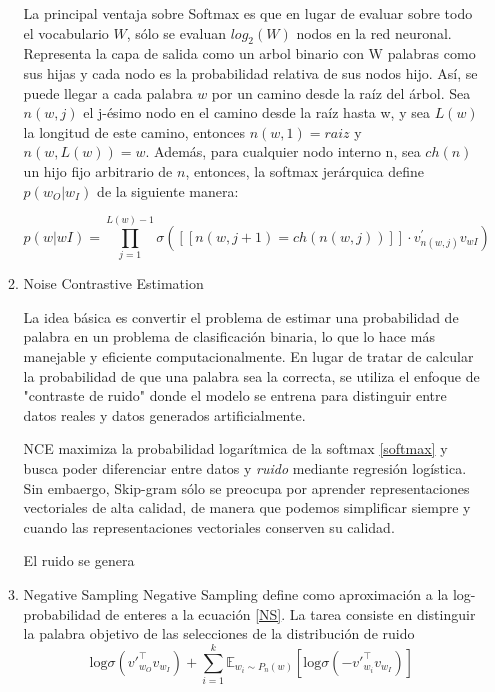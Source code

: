 \documentclass[letter, 11pt, twoside]{report}
\begin{document}
\begin{itemize}
\begin{enumerate}
      La principal ventaja sobre Softmax es que en lugar de evaluar sobre todo el vocabulario $W$, sólo se evaluan $log_2(W)$ nodos en la red neuronal. Representa la capa de salida como un arbol binario con W palabras como sus hijas y cada nodo es la probabilidad relativa de sus nodos hijo.
      Así, se puede llegar a cada palabra $w$ por un camino desde la raíz del árbol. Sea $n(w, j)$ el j-ésimo nodo en el camino desde la raíz hasta w, y sea $L(w)$ la longitud de este camino, entonces $n(w, 1) = raiz$ y $n(w, L(w)) = w$. Además, para cualquier nodo interno n, sea $ch(n)$ un hijo fijo arbitrario de $n$, entonces, la softmax jerárquica define $p(w_O|w_I )$ de la siguiente manera:

      \begin{equation}
        p(w|wI ) = \prod_{j=1}^{L(w)-1} \sigma \left( \left[ \left[ n(w, j + 1) = ch(n(w, j)) \right] \right] \cdot v_{n(w,j)}^\prime v_{wI} \right)
      \end{equation}

      
      
      \item Noise Contrastive Estimation 
      

      La idea básica es convertir el problema de estimar una probabilidad de palabra en un problema de clasificación binaria, lo que lo hace más manejable y eficiente computacionalmente. En lugar de tratar de calcular la probabilidad de que una palabra sea la correcta, se utiliza el enfoque de "contraste de ruido" donde el modelo se entrena para distinguir entre datos reales y datos generados artificialmente.
  
      NCE maximiza la probabilidad logarítmica de la softmax \ref{softmax} y busca poder diferenciar entre datos y \textit{ruido} mediante regresión logística. Sin embaergo, Skip-gram sólo se preocupa por aprender representaciones vectoriales de alta calidad, de manera que podemos simplificar siempre y cuando las representaciones vectoriales conserven su calidad. 


      El ruido se genera
      \item Negative Sampling
      Negative Sampling define como aproximación a la log-probabilidad de enteres a la ecuación \ref{NS}. La tarea consiste en distinguir la palabra objetivo de las selecciones de la distribución de ruido 
      \begin{equation}
        \text{log} \sigma(v'^\top_{w_O} v_{w_I}) + \sum_{i=1}^{k} \mathbb{E}_{w_i \sim P_n(w)} \left[ \text{log} \sigma(-v'^\top_{w_i} v_{w_I}) \right]
        \label{NS}
      \end{equation}
      

\end{enumerate}
\end{itemize}
\end{document}
